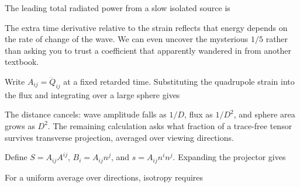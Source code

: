 \documentclass[
  11pt,
  letterpaper,
  oneside,
  openany]{scrbook}
\begin{document}
The leading total radiated power from a slow isolated source is

\begin{center}
\begingroup
{}
\ifdim\wd\grmathbox>\linewidth
\resizebox{\linewidth}{!}{\usebox{\grmathbox}}
\else\usebox{\grmathbox}\fi
\endgroup
\end{center}

The extra time derivative relative to the strain reflects that energy
depends on the rate of change of the wave. We can even uncover the
mysterious \(1/5\) rather than asking you to trust a coefficient that
apparently wandered in from another textbook.

Write \(A_{ij}=\dddot Q_{ij}\) at a fixed retarded time. Substituting
the quadrupole strain into the flux and integrating over a large sphere
gives

\begin{center}
\begingroup
{}
\ifdim\wd\grmathbox>\linewidth
\resizebox{\linewidth}{!}{\usebox{\grmathbox}}
\else\usebox{\grmathbox}\fi
\endgroup
\end{center}

The distance cancels: wave amplitude falls as \(1/D\), flux as
\(1/D^2\), and sphere area grows as \(D^2\). The remaining calculation
asks what fraction of a trace-free tensor survives transverse
projection, averaged over viewing directions.

Define \(S=A_{ij}A^{ij}\), \(B_i=A_{ij}n^j\), and \(s=A_{ij}n^i n^j\).
Expanding the projector gives

\begin{center}
\begingroup
{}
\ifdim\wd\grmathbox>\linewidth
\resizebox{\linewidth}{!}{\usebox{\grmathbox}}
\else\usebox{\grmathbox}\fi
\endgroup
\end{center}

For a uniform average over directions, isotropy requires

\begin{center}
\begingroup
{}
\ifdim\wd\grmathbox>\linewidth
\resizebox{\linewidth}{!}{\usebox{\grmathbox}}
\else\usebox{\grmathbox}\fi
\endgroup
\end{center}
\end{document}
